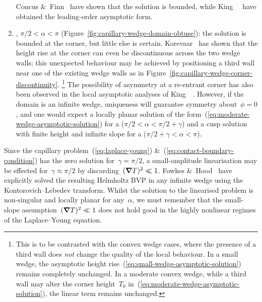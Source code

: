 \begin{enumerate}
    Concus \&~Finn~\cite{concus-1969-behavior-capillary-surface-wedge}
    have shown that the solution is bounded,
    while King~\etal~\cite{king-1999-laplace-young-near-corner}
    have obtained the leading-order asymptotic form.
  \item
    , $\pi/2 < \alpha < \pi$
    (Figure~\ref{fig:capillary-wedge-domain-obtuse}):
    the solution is bounded at the corner,
    but little else is certain.
    Korevaar~\cite{korevaar-1980-capillary-re-entrant-corner}
    has shown that the height rise at the corner
    can even be discontinuous across the two wedge walls;
    this unexpected behaviour may be achieved
    by positioning a third wall near one of the existing wedge walls
    as in Figure~\ref{fig:capillary-wedge-corner-discontinuity}.%
    \footnote{
      This is to be contrasted with the convex wedge cases,
      where the presence of a third wall
      does \emph{not} change the quality of the local behaviour.
      In a small wedge,
      the asymptotic height rise~(\ref{eq:small-wedge-asymptotic-solution})
      remains completely unchanged.
      In a moderate convex wedge,
      while a third wall may alter the corner height~$T_0$
      in~(\ref{eq:moderate-wedge-asymptotic-solution}),
      the linear term remains unchanged.
    }
    The possibility of asymmetry at a re-entrant corner
    has also been observed
    in the local asymptotic analyses
    of King~\etal~\cite{king-1999-laplace-young-near-corner}.
    However, if the domain is an infinite wedge,
    uniqueness will guarantee symmetry about~$\phi = 0$,
    and one would expect a locally planar solution
    of the form~(\ref{eq:moderate-wedge-asymptotic-solution})
    for a  ($\pi/2 < \alpha < \pi/2 + \gamma$)
    and a cusp solution with finite height and infinite slope
    for a  ($\pi/2 + \gamma < \alpha < \pi$).
\end{enumerate}
Since the capillary problem~(\ref{eq:laplace-young})
\&~(\ref{eq:contact-boundary-condition})
has the zero solution for~$\gamma = \pi/2$,
a small-amplitude linearisation may be effected for~$\gamma \approx \pi/2$
by discarding~$(\mathop{}\!\boldsymbol{\mathbf{\nabla}} T)^2 \ll 1$.
Fowkes \&~Hood~\cite{fowkes-1998-surface-tension-effects-wedge}
have explicitly solved the resulting Helmholtz BVP
in any infinite wedge
using the Kontorovich--Lebedev transform.
Whilst the solution to the linearised problem is non-singular
and locally planar for any~$\alpha$,
we must remember that the small-slope assumption~$(\mathop{}\!\boldsymbol{\mathbf{\nabla}} T)^2 \ll 1$
does not hold good
in the highly nonlinear regimes of the Laplace--Young equation.

